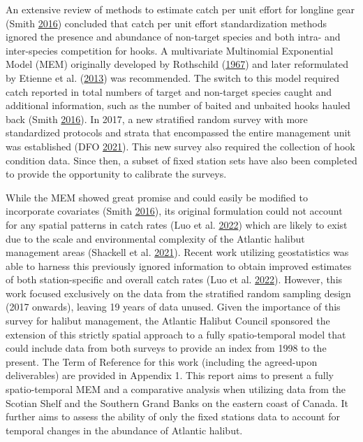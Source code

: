 \documentclass[12pt]{article}\usepackage[]{graphicx}\usepackage[]{color}
\begin{document}
An extensive review of methods to estimate catch per unit effort for longline gear (Smith \protect\hyperlink{ref-Smith2016a}{2016}) concluded that catch per unit effort standardization methods ignored the presence and abundance of non-target species and both intra- and inter-species competition for hooks. A multivariate Multinomial Exponential Model (MEM) originally developed by Rothschild (\protect\hyperlink{ref-Rothschild1967}{1967}) and later reformulated by Etienne et al. (\protect\hyperlink{ref-Etienne2013}{2013}) was recommended. The switch to this model required catch reported in total numbers of target and non-target species caught and additional information, such as the number of baited and unbaited hooks hauled back (Smith \protect\hyperlink{ref-Smith2016a}{2016}). In 2017, a new stratified random survey with more standardized protocols and strata that encompassed the entire management unit was established (DFO \protect\hyperlink{ref-DFO2021}{2021}). This new survey also required the collection of hook condition data. Since then, a subset of fixed station sets have also been completed to provide the opportunity to calibrate the surveys.

While the MEM showed great promise and could easily be modified to incorporate covariates (Smith \protect\hyperlink{ref-Smith2016a}{2016}), its original formulation could not account for any spatial patterns in catch rates (Luo et al. \protect\hyperlink{ref-Luo2022}{2022}) which are likely to exist due to the scale and environmental complexity of the Atlantic halibut management areas (Shackell et al. \protect\hyperlink{ref-Shackell2021}{2021}). Recent work utilizing geostatistics was able to harness this previously ignored information to obtain improved estimates of both station-specific and overall catch rates (Luo et al. \protect\hyperlink{ref-Luo2022}{2022}). However, this work focused exclusively on the data from the stratified random sampling design (2017 onwards), leaving 19 years of data unused. Given the importance of this survey for halibut management, the Atlantic Halibut Council sponsored the extension of this strictly spatial approach to a fully spatio-temporal model that could include data from both surveys to provide an index from 1998 to the present. The Term of Reference for this work (including the agreed-upon deliverables) are provided in Appendix 1. This report aims to present a fully spatio-temporal MEM and a comparative analysis when utilizing data from the Scotian Shelf and the Southern Grand Banks on the eastern coast of Canada. It further aims to assess the ability of only the fixed stations data to account for temporal changes in the abundance of Atlantic halibut.
\end{document}
